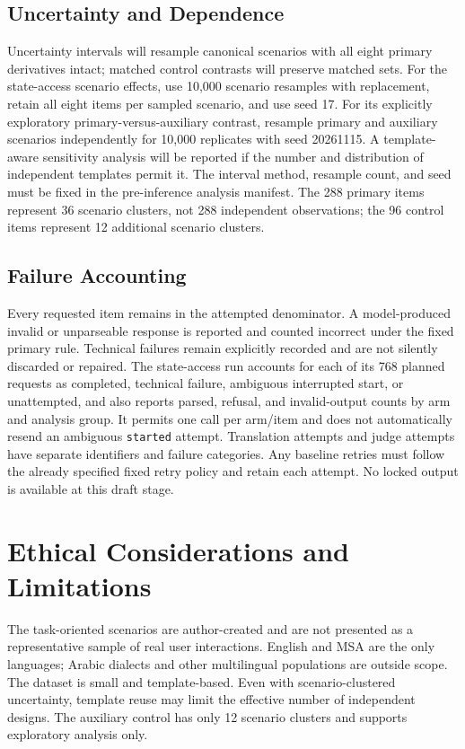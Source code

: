 \documentclass[11pt]{article}
\begin{document}
\subsection{Uncertainty and Dependence}
Uncertainty intervals will resample canonical scenarios with all eight primary derivatives intact; matched control contrasts will preserve matched sets. For the state-access scenario effects, use 10,000 scenario resamples with replacement, retain all eight items per sampled scenario, and use seed 17. For its explicitly exploratory primary-versus-auxiliary contrast, resample primary and auxiliary scenarios independently for 10,000 replicates with seed 20261115. A template-aware sensitivity analysis will be reported if the number and distribution of independent templates permit it. The interval method, resample count, and seed must be fixed in the pre-inference analysis manifest. The 288 primary items represent 36 scenario clusters, not 288 independent observations; the 96 control items represent 12 additional scenario clusters.

\subsection{Failure Accounting}
Every requested item remains in the attempted denominator. A model-produced invalid or unparseable response is reported and counted incorrect under the fixed primary rule. Technical failures remain explicitly recorded and are not silently discarded or repaired. The state-access run accounts for each of its 768 planned requests as completed, technical failure, ambiguous interrupted start, or unattempted, and also reports parsed, refusal, and invalid-output counts by arm and analysis group. It permits one call per arm/item and does not automatically resend an ambiguous \texttt{started} attempt. Translation attempts and judge attempts have separate identifiers and failure categories. Any baseline retries must follow the already specified fixed retry policy and retain each attempt. No locked output is available at this draft stage.

\section{Ethical Considerations and Limitations}
The task-oriented scenarios are author-created and are not presented as a representative sample of real user interactions. English and MSA{} are the only languages; Arabic dialects and other multilingual populations are outside scope. The dataset is small and template-based. Even with scenario-clustered uncertainty, template reuse may limit the effective number of independent designs. The auxiliary control has only 12 scenario clusters and supports exploratory analysis only.
\end{document}
